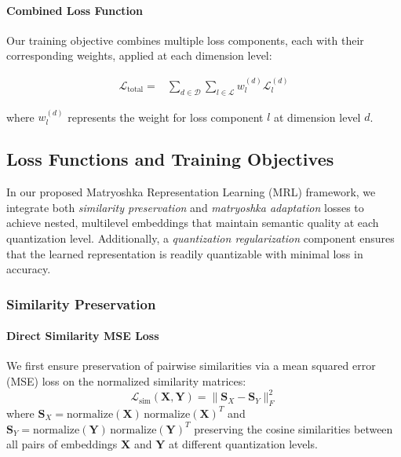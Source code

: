 \paragraph{Combined Loss Function}
Our training objective combines multiple loss components, each with their corresponding weights, applied at each dimension level:

\begin{equation}
\begin{split}
    \mathcal{L}_{\text{total}} = & \sum_{d \in \mathcal{D}} \sum_{l \in \mathcal{L}} w_l^{(d)} \mathcal{L}_l^{(d)}
\end{split}
\end{equation}

where $w_l^{(d)}$ represents the weight for loss component $l$ at dimension level $d$.
\subsection{Loss Functions and Training Objectives}
\label{subsec:loss_functions}

In our proposed Matryoshka Representation Learning (MRL) framework, we integrate both \emph{similarity preservation} and \emph{matryoshka adaptation} losses to achieve nested, multilevel embeddings that maintain semantic quality at each quantization level.
Additionally, a \emph{quantization regularization} component ensures that the learned representation is readily quantizable with minimal loss in accuracy. 

\subsubsection{Similarity Preservation}
\paragraph{Direct Similarity MSE Loss}
We first ensure preservation of pairwise similarities via a mean squared error (MSE) loss on the normalized similarity matrices:
\begin{equation}
    \mathcal{L}_{\text{sim}}(\mathbf{X}, \mathbf{Y}) = \|\mathbf{S}_X - \mathbf{S}_Y\|_F^2
\end{equation}
where $\mathbf{S}_X = \text{normalize}(\mathbf{X}) \,\text{normalize}(\mathbf{X})^T$ and $\mathbf{S}_Y = \text{normalize}(\mathbf{Y}) \,\text{normalize}(\mathbf{Y})^T$
preserving the cosine similarities between all pairs of embeddings $\mathbf{X}$ and $\mathbf{Y}$ at different quantization levels.

